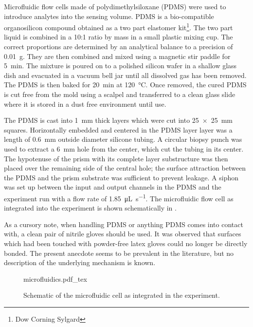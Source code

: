 Microfluidic flow cells made of polydimethylsiloxane (PDMS) were used to
introduce analytes into the sensing volume.  PDMS is a bio-compatible
organosilicon compound obtained as a two part elastomer kit\footnote{Dow
Corning Sylgard}.  The two part liquid is combined in a
10:1 ratio by mass in a small plastic mixing cup.  The correct proportions
are determined by an analytical balance to a precision of \SI{0.01}{\gram}.
They are then combined and mixed using a magnetic stir paddle for
\SI{5}{\minute}.  The mixture is poured on to a polished silicon wafer in a
shallow glass dish and evacuated in a vacuum bell jar until all dissolved
gas has been removed.  The PDMS is then baked for \SI{20}{\minute} at
\SI{120}{\celsius}.  Once removed, the cured PDMS is cut free from the mold
using a scalpel and transferred to a clean glass slide where it is stored
in a dust free environment until use.

The PDMS is cast into \SI{1}{\milli\meter} thick layers which were cut into
\SI{25x25}{\milli\meter} squares.  Horizontally embedded and centered in the
PDMS layer layer was a length of \SI{0.6}{\milli\meter} outside diameter
silicone tubing.  A circular biopsy punch was used to extract a
\SI{6}{\milli\meter} hole from the center, which cut the tubing in its center.
The hypotenuse of the prism with its complete layer substructure was then
placed over the remaining side of the central hole; the surface attraction
between the PDMS and the prism substrate was sufficient to prevent leakage.  A
siphon was set up between the input and output channels in the PDMS and the
experiment run with a flow rate of \SI{1.85}{\micro\liter\per\second}.  The
microfluidic flow cell as integrated into the experiment is shown schematically
in .

As a cursory note, when handling PDMS or anything PDMS comes into contact
with, a clean pair of nitrile gloves should be used.  It was observed that
surfaces which had been touched with powder-free latex gloves could no
longer be directly bonded.  The present anecdote seems to be prevalent in
the literature, but no description of the underlying mechanism is known.

\begin{figure}[ht]
\centering
{microfluidics.pdf_tex}
\caption{Schematic of the microfluidic cell as integrated in the experiment.}
\label{fig:microfluidiccell}
\end{figure}
